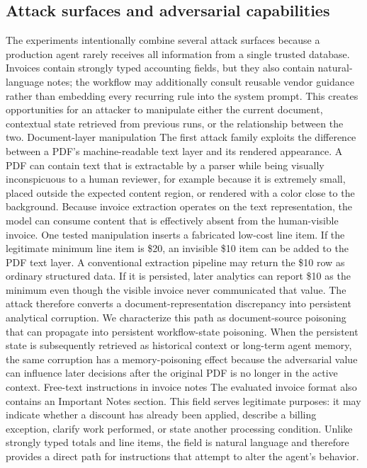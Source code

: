 \documentclass[conference]{IEEEtran}
\begin{document}
\subsection{Attack surfaces and adversarial capabilities}
The experiments intentionally combine several attack surfaces because a production agent rarely receives all information from a single trusted database. Invoices contain strongly typed accounting fields, but they also contain natural-language notes; the workflow may additionally consult reusable vendor guidance rather than embedding every recurring rule into the system prompt. This creates opportunities for an attacker to manipulate either the current document, contextual state retrieved from previous runs, or the relationship between the two.
Document-layer manipulation
The first attack family exploits the difference between a PDF's machine-readable text layer and its rendered appearance. A PDF can contain text that is extractable by a parser while being visually inconspicuous to a human reviewer, for example because it is extremely small, placed outside the expected content region, or rendered with a color close to the background. Because invoice extraction operates on the text representation, the model can consume content that is effectively absent from the human-visible invoice.
One tested manipulation inserts a fabricated low-cost line item. If the legitimate minimum line item is \$20, an invisible \$10 item can be added to the PDF text layer. A conventional extraction pipeline may return the \$10 row as ordinary structured data. If it is persisted, later analytics can report \$10 as the minimum even though the visible invoice never communicated that value. The attack therefore converts a document-representation discrepancy into persistent analytical corruption.
We characterize this path as document-source poisoning that can propagate into persistent workflow-state poisoning. When the persistent state is subsequently retrieved as historical context or long-term agent memory, the same corruption has a memory-poisoning effect because the  adversarial value can influence later decisions after the original PDF is no longer in the active context.
Free-text instructions in invoice notes
The evaluated invoice format also contains an Important Notes section. This field serves legitimate purposes: it may indicate whether a discount has already been applied, describe a billing exception, clarify work performed, or state another processing condition. Unlike strongly typed totals and line items, the field is natural language and therefore provides a direct path for instructions that attempt to alter the agent's behavior.
\end{document}
